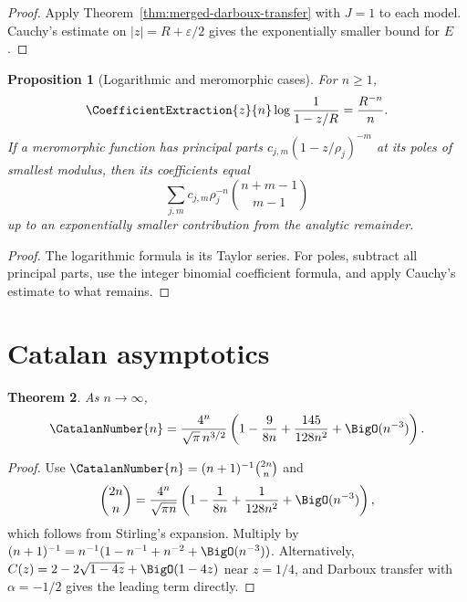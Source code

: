 \documentclass[11pt,a4paper,oneside,openany]{book}
\newtheorem{theorem}{Theorem}[chapter]
\newtheorem{proposition}[theorem]{Proposition}
\theoremstyle{definition}
\theoremstyle{remark}
\begin{document}
\begin{proof}
Apply Theorem~\ref{thm:merged-darboux-transfer} with $J=1$ to each model.
Cauchy's estimate on $|z|=R+\varepsilon/2$ gives the exponentially smaller
bound for $E$.
\end{proof}

\begin{proposition}[Logarithmic and meromorphic cases]
For $n\geq1$,
\begin{equation}
 \CoefficientExtraction{z}{n}\log\frac1{1-z/R}=\frac{R^{-n}}n.                             \label{eq:merged-log-transfer}
\end{equation}
If a meromorphic function has principal parts
$c_{j,m}(1-z/\rho_j)^{-m}$ at its poles of smallest modulus, then its
coefficients equal
\begin{equation}
 \sum_{j,m}c_{j,m}\rho_j^{-n}\binom{n+m-1}{m-1}
\end{equation}
up to an exponentially smaller contribution from the analytic remainder.
\end{proposition}

\begin{proof}
The logarithmic formula is its Taylor series.  For poles, subtract all
principal parts, use the integer binomial coefficient formula, and apply
Cauchy's estimate to what remains.
\end{proof}

\section{Catalan asymptotics}

\begin{theorem}
As $n\to\infty$,
\begin{equation}
 \CatalanNumber{n}=\frac{4^n}{\sqrt\pi\,n^{3/2}}
 \left(1-\frac9{8n}+\frac{145}{128n^2}+\BigO(n^{-3})\right).            \label{eq:merged-catalan-asymp}
\end{equation}
\end{theorem}

\begin{proof}
Use $\CatalanNumber{n}=(n+1)^{-1}\binom{2n}{n}$ and
\[
 \binom{2n}{n}=\frac{4^n}{\sqrt{\pi n}}
 \left(1-\frac1{8n}+\frac1{128n^2}+\BigO(n^{-3})\right),
\]
which follows from Stirling's expansion.  Multiply by
$(n+1)^{-1}=n^{-1}(1-n^{-1}+n^{-2}+\BigO(n^{-3}))$.
Alternatively, $C(z)=2-2\sqrt{1-4z}+\BigO(1-4z)$ near $z=1/4$, and Darboux
transfer with $\alpha=-1/2$ gives the leading term directly.
\end{proof}
\end{document}
